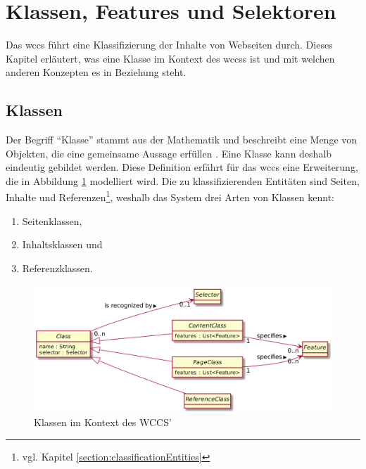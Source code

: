 \section{Klassen, Features und Selektoren}
    \label{section:conceptClassesFeaturesSelectors}
    Das \gls{wccs} führt eine Klassifizierung der Inhalte von Webseiten durch.
    Dieses Kapitel erläutert, was eine Klasse im Kontext des \glspl{wccs} ist
    und mit welchen anderen Konzepten es in Beziehung steht.

    \subsection{Klassen}
        Der Begriff "`Klasse"' stammt aus der Mathematik und beschreibt eine Menge von Objekten,
        die eine gemeinsame Aussage erfüllen \cite{oberschelp:Mengenlehre}.
        Eine Klasse kann deshalb eindeutig gebildet werden.
        Diese Definition erfährt für das \gls{wccs} eine Erweiterung,
        die in Abbildung \ref{image:conceptClasses} modelliert wird.
        Die zu klassifizierenden Entitäten sind Seiten, Inhalte und
        Referenzen\footnote{vgl. Kapitel \ref{section:classificationEntities}},
        weshalb das System drei Arten von Klassen kennt:

        \begin{enumerate}
            \item Seitenklassen,
            \item Inhaltsklassen und
            \item Referenzklassen.
        \end{enumerate}

        \begin{figure}[htb]
            \centering
            \includegraphics[scale=\imageScalingFactor]{../resources/concept/classes.png}
            \caption{Klassen im Kontext des WCCS'}
            \label{image:conceptClasses}
        \end{figure}     

